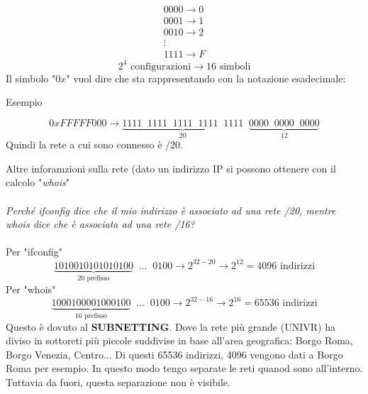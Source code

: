 \documentclass[a4paper]{article}
\begin{document}
\[\begin{matrix}
    0000 \rightarrow 0\\
    0001 \rightarrow 1\\
    0010 \rightarrow 2\\
    \vdots\\
    1111 \rightarrow F
\end{matrix}\]
\[2^4 \text{ configurazioni} \rightarrow 16 \text{ simboli}\]
Il simbolo "$0x$" vuol dire che sta rappresentando con la notazione esadecimale:
\begin{examplebox}{Esempio}
    
\[0xFFFFF000 \rightarrow \underbrace{1111  \; \; 1111 \; \; 1111 \; \; 1111  \; \;1111}_{20} \; \; \underbrace{0000  \; \;0000 \; \; 0000}_{12}\]
Quindi la rete a cui sono connesso è $/20$.
\end{examplebox}
Altre inforamzioni sulla rete (dato un indirizzo IP si possono ottenere con il calcolo "\textit{whois}"
\\\\
\textit{Perché ifconfig dice che il mio indirizzo è associato ad una rete /20, mentre whois dice che è associata ad una rete /16?}
\\\\
Per "ifconfig" 
\[\underbrace{1010010101010100}_{20 \text{ prefisso}} \;\; ... \; \; 0100 \rightarrow 2^{32-20} \rightarrow 2^{12} = 4096 \text{ indirizzi}\]
Per "whois"
\[\underbrace{1000100001000100}_{16 \text{ prefisso}} \;\; ... \; \; 0100 \rightarrow 2^{32-16} \rightarrow 2^{16} = 65536 \text{ indirizzi}\]
Questo è dovuto al \textbf{SUBNETTING}. Dove la rete più grande (UNIVR) ha diviso in sottoreti più piccole suddivise in base all'area geografica: Borgo Roma, Borgo Venezia, Centro... Di questi 65536 indirizzi, 4096 vengono dati a Borgo Roma per esempio. In questo modo tengo separate le reti quanod sono all'interno. Tuttavia da fuori, questa separazione non è visibile.
\end{document}
